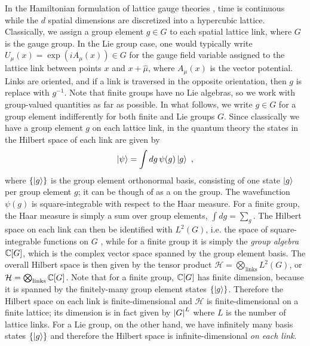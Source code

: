 In the Hamiltonian formulation of lattice gauge theories \cite{KogSuss, Osborne, ZoharBurrello}, time is continuous while the $d$ spatial dimensions are discretized into a hypercubic lattice.
Classically, we assign a group element $g \in G$ to each spatial lattice link, where $G$ is the gauge group.
In the Lie group case, one would typically write $U_\mu(x) = \exp{(iA_\mu(x))} \in G$ for the gauge field variable assigned to the lattice link between points $x$ and $x + \hat{\mu}$, where $A_\mu(x)$ is the vector potential.
Links are oriented, and if a link is traversed in the opposite orientation, then $g$ is replace with $g^{-1}$.
Note that finite groups have no Lie algebras, so we work with group-valued quantities as far as possible.
In what follows, we write $g \in G$ for a group element indifferently for both finite and Lie groups $G$.
Since classically we have a group element $g$ on each lattice link, in the quantum theory the states in the Hilbert space of each link are given by \cite{Osborne}
\begin{equation}
    \ket{\psi}=\int dg \, \psi(g)\ket{g} \ ,
\end{equation}
where $\{\ket{g}\}$ is the group element orthonormal basis, consisting of one state $\ket{g}$ per group element $g$; it can be though of as a  on the group.
The wavefunction $\psi(g)$ is square-integrable with respect to the Haar measure.
For a finite group, the Haar measure is simply a sum over group elements, $\int dg = \sum_g$.
The Hilbert space on each link can then be identified with $L^2(G)$, i.e. the space of square-integrable functions on $G$ \cite{Osborne}, while for a finite group it is simply the \textit{group algebra} $\mathbb{C}[G]$, which is the complex vector space spanned by the group element basis.
The overall Hilbert space is then given by the tensor product $\mathcal{H} = \bigotimes_{\mathrm{links}} L^2(G)$, or $\mathcal{H} = \bigotimes_{\mathrm{links}} \mathbb{C}[G]$.
Note that for a finite group, $\mathbb{C}[G]$ has finite dimension, because it is spanned by the finitely-many group element states $\{\ket{g}\}$.
Therefore the Hilbert space on each link is finite-dimensional and $\mathcal{H}$ is finite-dimensional on a finite lattice; its dimension is in fact given by $\abs{G}^L$ where $L$ is the number of lattice links.
For a Lie group, on the other hand, we have infinitely many basis states $\{\ket{g}\}$ and therefore the Hilbert space is infinite-dimensional \textit{on each link}.

